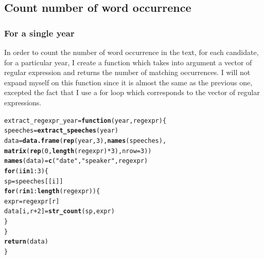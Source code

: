 \documentclass{llncs}\usepackage[]{graphicx}\usepackage[]{color}
\makeatletter
\newcommand{\hlnum}[1]{\textcolor[rgb]{0.686,0.059,0.569}{#1}}%
\newcommand{\hlstr}[1]{\textcolor[rgb]{0.192,0.494,0.8}{#1}}%
\newcommand{\hlopt}[1]{\textcolor[rgb]{0,0,0}{#1}}%
\newcommand{\hlstd}[1]{\textcolor[rgb]{0.345,0.345,0.345}{#1}}%
\newcommand{\hlkwa}[1]{\textcolor[rgb]{0.161,0.373,0.58}{\textbf{#1}}}%
\newcommand{\hlkwb}[1]{\textcolor[rgb]{0.69,0.353,0.396}{#1}}%
\newcommand{\hlkwc}[1]{\textcolor[rgb]{0.333,0.667,0.333}{#1}}%
\newcommand{\hlkwd}[1]{\textcolor[rgb]{0.737,0.353,0.396}{\textbf{#1}}}%
\newenvironment{kframe}{%
 \def\at@end@of@kframe{}%
 \ifinner\ifhmode%
  \def\at@end@of@kframe{\end{minipage}}%
  \begin{minipage}{\columnwidth}%
 \fi\fi%
 \def\FrameCommand##1{\hskip\@totalleftmargin \hskip-\fboxsep
 \colorbox{shadecolor}{##1}\hskip-\fboxsep
     \hskip-\linewidth \hskip-\@totalleftmargin \hskip\columnwidth}%
 \MakeFramed {\advance\hsize-\width
   \@totalleftmargin\z@ \linewidth\hsize
   \@setminipage}}%
 {\par\unskip\endMakeFramed%
 \at@end@of@kframe}
\newenvironment{knitrout}{}{} %
\makeatother
\begin{document}
\subsection{Count number of word occurrence}
\subsubsection{For a single year}
In order to count the number of word occurrence in the text, for each candidate, for a particular year, I create a function which takes into argument a vector of regular expression and returns the number of matching occurrences. I will not expand myself on this function since it is almost the same as the previous one, excepted the fact that I use a for loop which corresponds to the vector of regular expressions.
\begin{knitrout}
\color{fgcolor}\begin{kframe}
\begin{alltt}
\hlstd{extract_regexpr_year} \hlkwb{=} \hlkwa{function}\hlstd{(}\hlkwc{year}\hlstd{,}\hlkwc{regexpr}\hlstd{)\{}
  \hlstd{speeches}\hlkwb{=} \hlkwd{extract_speeches}\hlstd{(year)}
  \hlstd{data}\hlkwb{=}\hlkwd{data.frame}\hlstd{(}\hlkwd{rep}\hlstd{(year,}\hlnum{3}\hlstd{),}\hlkwd{names}\hlstd{(speeches),}
                  \hlkwd{matrix}\hlstd{(}\hlkwd{rep}\hlstd{(}\hlnum{0}\hlstd{,}\hlkwd{length}\hlstd{(regexpr)}\hlopt{*}\hlnum{3}\hlstd{),}\hlkwc{nrow}\hlstd{=}\hlnum{3}\hlstd{))}
  \hlkwd{names}\hlstd{(data)}\hlkwb{=}\hlkwd{c}\hlstd{(}\hlstr{"date"}\hlstd{,}\hlstr{"speaker"}\hlstd{,regexpr)}
  \hlkwa{for} \hlstd{(i} \hlkwa{in} \hlnum{1}\hlopt{:}\hlnum{3}\hlstd{)\{}
    \hlstd{sp}\hlkwb{=}\hlstd{speeches[[i]]}
    \hlkwa{for} \hlstd{(r} \hlkwa{in} \hlnum{1}\hlopt{:}\hlkwd{length}\hlstd{(regexpr))\{}
      \hlstd{expr}\hlkwb{=}\hlstd{regexpr[r]}
      \hlstd{data[i,r}\hlopt{+}\hlnum{2}\hlstd{]}\hlkwb{=}\hlkwd{str_count}\hlstd{(sp,expr)}
    \hlstd{\}}
  \hlstd{\}}
  \hlkwd{return} \hlstd{(data)}
\hlstd{\}}
\end{alltt}
\end{kframe}
\end{knitrout}
\end{document}
